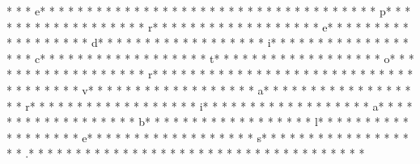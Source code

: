 * *  * e* * *  * * *  * * *  *  * * *  *  * * *  *  * * *  * * *  * * *  *  * * *  *  * * *  * p* * *  * * *  * * *  *  * * *  *  * * *  * r* * *  * * *  * * *  *  * * *  *  * * *  * e* * *  * * *  * * *  *  * * *  *  * * *  * d* * *  * * *  * * *  *  * * *  *  * * *  * i* * *  * * *  * * *  *  * * *  *  * * *  * c* * *  * * *  * * *  *  * * *  *  * * *  * t* * *  * * *  * * *  *  * * *  *  * * *  * o* * *  * * *  * * *  *  * * *  *  * * *  * r* * *  * * *  * * *  *  * * *  *  * * *  *  * * *  * * *  * * *  *  * * *  *  * * *  * v* * *  * * *  * * *  *  * * *  *  * * *  * a* * *  * * *  * * *  *  * * *  *  * * *  * r* * *  * * *  * * *  *  * * *  *  * * *  * i* * *  * * *  * * *  *  * * *  *  * * *  * a* * *  * * *  * * *  *  * * *  *  * * *  * b* * *  * * *  * * *  *  * * *  *  * * *  * l* * *  * * *  * * *  *  * * *  *  * * *  * e* * *  * * *  * * *  *  * * *  *  * * *  * s* * *  * * *  * * *  *  * * *  *  * * *  * .* * *  * * *  * * *  *  * * *  *  * * *  *  * * *  * * *  * * *  *  * * *  *  * * *  * 
